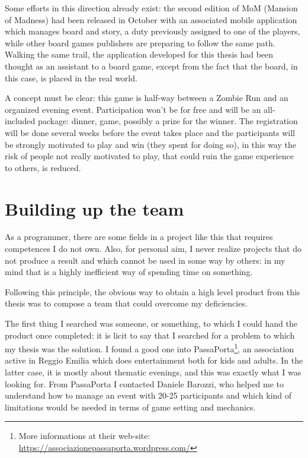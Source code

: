 		Some efforts in this direction already exist: the second edition of MoM (Mansion of Madness) had been released in October with an associated mobile application which manages board and story, a duty previously assigned to one of the players, while other board games publishers are preparing to follow the same path.
		Walking the same trail, the application developed for this thesis had been thought as an assistant to a board game, except from the fact that the board, in this case, is placed in the real world.
		
		A concept must be clear: this game is half-way between a Zombie Run and an organized evening event.
		Participation won't be for free and will be an all-included package: dinner, game, possibly a prize for the winner.
		The registration will be done several weeks before the event takes place and the participants will be strongly motivated to play and win (they spent for doing so), in this way the risk of people not really motivated to play, that could ruin the game experience to others, is reduced.

		\newpage
	
	\section{Building up the team}
		
		As a programmer, there are some fields in a project like this that requires competences I do not own.
		Also, for personal aim, I never realize projects that do not produce a result and which cannot be used in some way by others: in my mind that is a highly inefficient way of spending time on something.
		
		Following this principle, the obvious way to obtain a high level product from this thesis was to compose a team that could overcome my deficiencies.
		
		The first thing I searched was someone, or something, to which I could hand the product once completed: it is licit to say that I searched for a problem to which my thesis was the solution.
		I found a good one into PassaPorta\footnote{More informations at their web-site: \url{ https://associazionepassaporta.wordpress.com/}}, an association active in Reggio Emilia which does entertainment both for kids and adults.
		In the latter case, it is mostly about thematic evenings, and this was exactly what I was looking for.
		From PassaPorta I contacted Daniele Barozzi, who helped me to understand how to manage an event with 20-25 participants and which kind of limitations would be needed in terms of game setting and mechanics.
		
